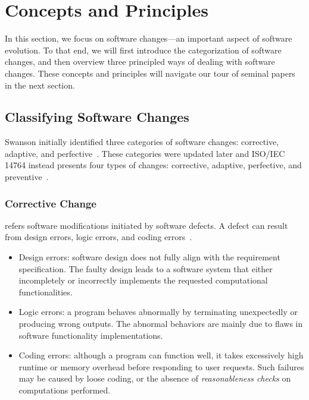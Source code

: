 \documentclass[runningheads,a4paper]{llncs}
\begin{document}

\section{Concepts and Principles}
\label{sec:concepts}

In this section, we focus on software changes---an important aspect of software evolution. To that end, we will first introduce the categorization of software changes, and then overview three principled ways of dealing with software changes. These concepts and principles will navigate our tour of seminal papers in the next section.

\subsection{Classifying Software Changes}
Swanson initially identified three categories of software changes: corrective, adaptive, and perfective~\cite{Swanson1976:Dimension}. These categories were updated later and ISO/IEC 14764 instead presents four types of changes: corrective, adaptive, perfective, and preventive~\cite{iso}.
\subsubsection{Corrective Change} refers software modifications initiated by software defects. A defect can result from design errors, logic errors, and coding errors~\cite{Longstreet1990:smc}.

\begin{itemize}
\item Design errors: software design does not fully align with the requirement specification. The faulty design leads to a software system that either incompletely or incorrectly implements the requested computational functionalities. 
\item Logic errors: a program behaves abnormally by terminating unexpectedly or producing wrong outputs. The abnormal behaviors are mainly due to flaws in software functionality implementations.
\item Coding errors: although a program can function well, it takes excessively high runtime or memory overhead before responding to user requests. Such failures may be caused by loose coding, or the absence of {\em reasonableness checks} on computations performed.
\end{itemize}
\end{document}
